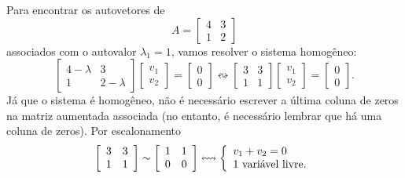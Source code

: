 \begin{ex}
	Para encontrar os autovetores de
	\begin{equation}
	A =
	\left[
	\begin{array}{cc}
	4 & 3 \\
	1 & 2
	\end{array}
	\right]
	\end{equation} associados com o autovalor $\lambda_1 = 1$, vamos resolver o sistema homogêneo:
	\begin{equation}
	\left[
	\begin{array}{cc}
	4-\lambda & 3 \\
	1 & 2-\lambda
	\end{array}
	\right] \left[
	\begin{array}{c}
	v_1 \\
	v_2
	\end{array}
	\right] = \left[
	\begin{array}{c}
	0 \\
	0
	\end{array}
	\right] \leftrightsquigarrow
	\left[
	\begin{array}{cc}
	3 & 3 \\
	1 & 1
	\end{array}
	\right] \left[
	\begin{array}{c}
	v_1 \\
	v_2
	\end{array}
	\right] = \left[
	\begin{array}{c}
	0 \\
	0
	\end{array}
	\right].
	\end{equation} Já que o sistema é homogêneo, não é necessário escrever a última coluna de zeros na matriz aumentada associada (no entanto, é necessário lembrar que há uma coluna de zeros). Por escalonamento
	\begin{equation}
	\left[
	\begin{array}{cc}
	3 & 3 \\
	1 & 1
	\end{array}
	\right] \sim
	\left[
	\begin{array}{cc}
	1 & 1 \\
	0 & 0
	\end{array}
	\right] \leftrightsquigarrow
	\left\{
	\begin{array}{ll}
	v_1 + v_2 = 0 \\
	\hbox{1 variável livre.}
	\end{array}
	\right.

\end{equation}
\end{ex}
